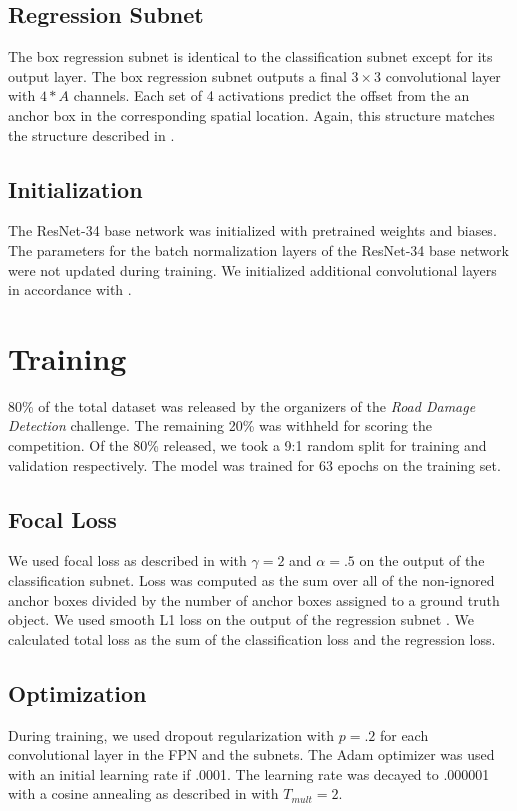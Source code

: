 \documentclass[conference]{IEEEtran}
\begin{document}
\subsection{Regression Subnet}
The box regression subnet is identical to the classification subnet except for its output layer. The box regression subnet outputs a final $3 \times 3$ convolutional layer with $4 * A$ channels. Each set of 4 activations predict the offset from the an anchor box in the corresponding spatial location. Again, this structure matches the structure described in \cite{retinanet}. 

\subsection{Initialization}
The ResNet-34 base network was initialized with pretrained weights and biases. The parameters for the batch normalization layers of the ResNet-34 base network were not updated during training. We initialized additional convolutional layers in accordance with \cite{retinanet}. 

\section{Training}
80\% of the total dataset was released by the organizers of the \textit{Road Damage Detection} challenge. The remaining 20\% was withheld for scoring the competition. Of the 80\% released, we took a 9:1 random split for training and validation respectively. The model was trained for 63 epochs on the training set.  

\subsection{Focal Loss}
We used focal loss as described in \cite{retinanet} with $\gamma = 2$ and $\alpha = .5$ on the output of the classification subnet. Loss was computed as the sum over all of the non-ignored anchor boxes divided by the number of anchor boxes assigned to a ground truth object. We used smooth L1 loss on the output of the regression subnet \cite{rcnn}. We calculated total loss as the sum of the classification loss and the regression loss.  

\subsection{Optimization}
During training, we used dropout regularization with $p = .2$ for each convolutional layer in the FPN and the subnets. The Adam optimizer \cite{adam} was used with an initial learning rate if .0001. The learning rate was decayed to .000001 with a cosine annealing as described in \cite{sgdr} with $T_{mult} = 2$.
\end{document}
